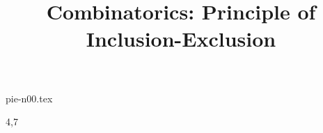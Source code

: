 \documentclass[a4paper,12pt]{article}
\begin{document}
\title{Combinatorics: Principle of Inclusion-Exclusion}
\newcommand\event{S.3,4 Elite Mathematics Training}
\newcommand\learningobjective{
\item Understand the concepts of counting each element exactly once
\item Learn the Principle of Inclusion-Exclusion
\item Learn the application of PIE (derangement)
}

\myfrontpage

{pie-n00.tex}

\begin{question}[]{4,7}
    
    
    
    
    
    
    
    
    
    
\end{question}
\end{document}
